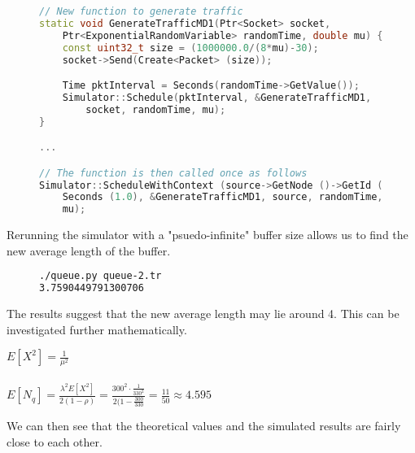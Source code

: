 \documentclass[a4paper, titlepage,12pt]{article}
\begin{document}
			\begin{figure}[h!]
				\begin{lstlisting}[language=c++]
// New function to generate traffic
static void GenerateTrafficMD1(Ptr<Socket> socket, 
	Ptr<ExponentialRandomVariable> randomTime, double mu) {
    const uint32_t size = (1000000.0/(8*mu)-30);
    socket->Send(Create<Packet> (size));

    Time pktInterval = Seconds(randomTime->GetValue());
    Simulator::Schedule(pktInterval, &GenerateTrafficMD1,
		socket, randomTime, mu);
}

...

// The function is then called once as follows
Simulator::ScheduleWithContext (source->GetNode ()->GetId (),
	Seconds (1.0), &GenerateTrafficMD1, source, randomTime,
	mu);
				\end{lstlisting}
			\end{figure}

			Rerunning the simulator with a "psuedo-infinite" buffer size allows us to find the new average length of the buffer.

			\begin{figure}[h!]
				\begin{lstlisting}[language=sh]
./queue.py queue-2.tr
3.7590449791300706
				\end{lstlisting}
			\end{figure}

			The results suggest that the new average length may lie around 4. This can be investigated further mathematically. 

			\begin{center}
				$E[X^2] = \frac{1}{\mu^2}$\\~\\
				$E[N_q] = \frac{\lambda^2 E[X^2]}{2(1-\rho)} = \frac{300^2 \cdot \frac{1}{330^2}}{2(1-\frac{300}{330}} = \frac{11}{50} \approx 4.595$
			\end{center}

			We can then see that the theoretical values and the simulated results are fairly close to each other.
\end{document}
